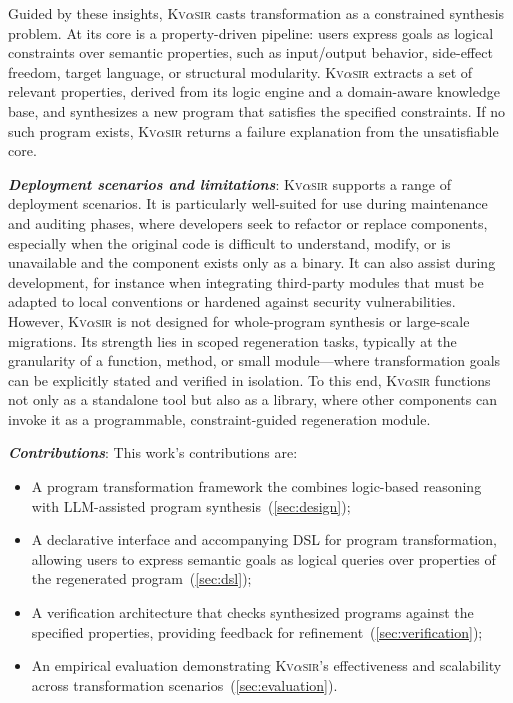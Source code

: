 \documentclass[nonacm,sigplan]{acmart}
\newcommand{\sys}{{\scshape Kv{$\alpha$}sir}\xspace}
\newcommand{\heading}[1]{\vspace{2pt}\noindent\textbf{\emph{#1}}:\enspace}
\begin{document}
Guided by these insights, \sys casts transformation as a constrained synthesis problem.
At its core is a property-driven pipeline: users express goals as logical constraints over semantic properties, such as input/output behavior, side-effect freedom, target language, or structural modularity.
\sys extracts a set of relevant properties, derived from its logic engine and a domain-aware knowledge base, and synthesizes a new program that satisfies the specified constraints.
If no such program exists, \sys returns a failure explanation from the unsatisfiable core.

\heading{Deployment scenarios and limitations}
\sys supports a range of deployment scenarios.
It is particularly well-suited for use during maintenance and auditing phases, where developers seek to refactor or replace components, especially when the original code is difficult to understand, modify, or is unavailable and the component exists only as a binary.
It can also assist during development, for instance when integrating third-party modules that must be adapted to local conventions or hardened against security vulnerabilities.
However, \sys is not designed for whole-program synthesis or large-scale migrations.
Its strength lies in scoped regeneration tasks, typically at the granularity of a function, method, or small module---where transformation goals can be explicitly stated and verified in isolation.
To this end, \sys functions not only as a standalone tool but also as a
library, where other components can invoke it as a programmable,
constraint-guided regeneration module.


\heading{Contributions}
This work's contributions are:
\begin{itemize}
 \item A program transformation framework the combines logic-based reasoning with LLM-assisted program synthesis~(\cref{sec:design});
 \item A declarative interface and accompanying DSL for program transformation, allowing users to express semantic goals as logical queries over properties of the regenerated program~(\cref{sec:dsl});
 \item A verification architecture that checks synthesized programs against the specified properties, providing feedback for refinement~(\cref{sec:verification});
 \item An empirical evaluation demonstrating \sys's effectiveness and scalability across transformation scenarios~(\cref{sec:evaluation}).
\end{itemize}
\end{document}
